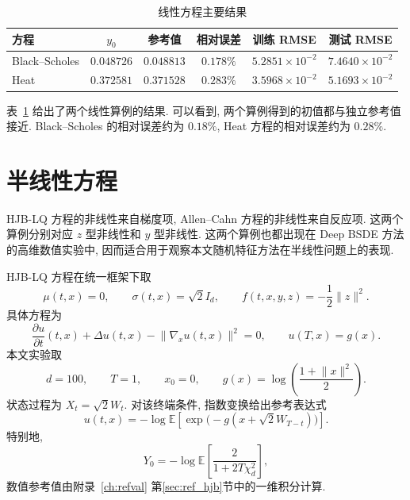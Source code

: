     \begin{table}[htbp]
      \centering
      \caption{线性方程主要结果}
      \label{tab:linear_main_results}
      \begin{tabular}{lccccc}
        \toprule
        方程 & $y_0$ & 参考值 & 相对误差 & 训练 RMSE & 测试 RMSE \\
        \midrule
        Black--Scholes & $0.048726$ & $0.048813$ & $0.178\%$ & $5.2851\times10^{-2}$ & $7.4640\times10^{-2}$ \\
        Heat & $0.372581$ & $0.371528$ & $0.283\%$ & $3.5968\times10^{-2}$ & $5.1693\times10^{-2}$ \\
        \bottomrule
      \end{tabular}
    \end{table}

    表~\ref{tab:linear_main_results} 给出了两个线性算例的结果.
    可以看到, 两个算例得到的初值都与独立参考值接近.
    Black--Scholes 的相对误差约为 $0.18\%$, Heat 方程的相对误差约为 $0.28\%$.

  \section{半线性方程}\label{sec:numerical_nonlinear}
    HJB-LQ 方程的非线性来自梯度项, Allen--Cahn 方程的非线性来自反应项.
    这两个算例分别对应 $z$ 型非线性和 $y$ 型非线性.
    这两个算例也都出现在 Deep BSDE 方法的高维数值实验中,
    因而适合用于观察本文随机特征方法在半线性问题上的表现\cite{hanSolvingHighdimensionalPartial2018}.

    HJB-LQ 方程在统一框架下取
    \begin{equation}
      \mu(t,x)=0,\qquad
      \sigma(t,x)=\sqrt{2}I_d,\qquad
      f(t,x,y,z)=-\frac{1}{2}\lVert z\rVert^2.
      \label{eq:numerical_hjblq_coeff}
    \end{equation}
    具体方程为
    \begin{equation}
      \frac{\partial u}{\partial t}(t,x)
      + \Delta u(t,x)
      - \lVert\nabla_x u(t,x)\rVert^2
      =0,
      \qquad
      u(T,x)=g(x).
      \label{eq:numerical_hjblq_pde}
    \end{equation}
    本文实验取
    \begin{equation}
      d=100,\qquad T=1,\qquad x_0=0,\qquad
      g(x)=\log\!\left(\frac{1+\lVert x\rVert^2}{2}\right).
      \label{eq:numerical_hjblq_terminal}
    \end{equation}
    状态过程为 $X_t=\sqrt{2}W_t$.
    对该终端条件, 指数变换给出参考表达式
    \begin{equation}
      u(t,x)
      =
      -\log
      \mathbb{E}\left[
        \exp\bigl(-g(x+\sqrt{2}W_{T-t})\bigr)
      \right].
      \label{eq:numerical_hjblq_reference}
    \end{equation}
    特别地,
    \begin{equation}
      Y_0
      =
      -\log
      \mathbb{E}
      \left[
        \frac{2}{1+2T\chi_d^2}
      \right],
      \label{eq:numerical_hjblq_y0}
    \end{equation}
    数值参考值由附录~\ref{ch:refval} 第\ref{sec:ref_hjb}节中的一维积分计算.

